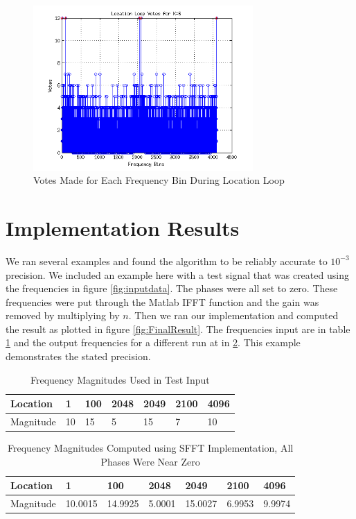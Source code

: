 \documentclass[journal]{IEEEtran}
\begin{document}
\begin{figure}[h]
\centering
\includegraphics[width=3.3in]{../images/votes.png}
\caption{Votes Made for Each Frequency Bin During Location Loop}
\label{fig:votes}
\end{figure}


\section{Implementation Results}
\par We ran several examples and found the algorithm to be reliably accurate to \(10^{-3}\) precision. We included an example here with a test signal that was created using the frequencies in figure \ref{fig:inputdata}. The phases were all set to zero. These frequencies were put through the Matlab IFFT function and the gain was removed by multiplying by \(n\). Then we ran our implementation and computed the result as plotted in figure \ref{fig:FinalResult}. The frequencies input are in table \ref{table:freqs} and the output frequencies for a different run at in \ref{table:cfreqs}. This example demonstrates the stated precision.

\begin{table}[h!]
\centering
\begin{tabular}{|l|l|l|l|l|l|l|}
\hline
Location  & 1 & 100 & 2048 & 2049 & 2100 & 4096 \\ \hline
Magnitude & 10 & 15 & 5 & 15 & 7 & 10 \\ \hline
\end{tabular}
\caption{Frequency Magnitudes Used in Test Input}
\label{table:freqs}
\end{table}

\begin{table}[h!]
\centering
\begin{tabular}{|l|l|l|l|l|l|l|}
\hline
Location  & 1 & 100 & 2048 & 2049 & 2100 & 4096 \\ \hline
Magnitude & 10.0015 & 14.9925 & 5.0001 & 15.0027 & 6.9953 &  9.9974 \\ \hline
\end{tabular}
\caption{Frequency Magnitudes Computed using SFFT Implementation, All Phases Were Near Zero}
\label{table:cfreqs}
\end{table}
\end{document}
